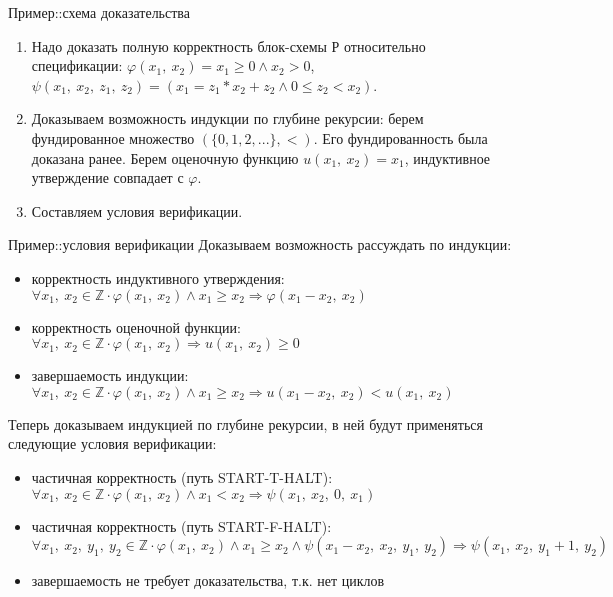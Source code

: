 \documentclass[hyperref={unicode=true}]{beamer}
\begin{document}
    \begin{frame}{Пример::схема доказательства}
    \begin{enumerate}
    \item
    Надо доказать полную корректность блок-схемы Р относительно
    спецификации: $\varphi(x_1,~x_2) = x_1 \geq 0 \land x_2 > 0$,
    $\psi(x_1,~x_2,~z_1,~z_2) = (x_1 = z_1 * x_2 + z_2 \land 0 \leq z_2 < x_2)$.

    \item
    Доказываем возможность индукции по глубине рекурсии:
    берем фундированное множество $(\{0, 1, 2, ...\}, <)$. Его фундированность
    была доказана ранее. Берем оценочную функцию $u(x_1,~x_2) = x_1$,
    индуктивное утверждение совпадает с $\varphi$.

    \item
    Составляем условия верификации.
    \end{enumerate}
    \end{frame}

    \begin{frame}{Пример::условия верификации}
    Доказываем возможность рассуждать по индукции:
    \begin{itemize}
    \item корректность индуктивного утверждения:
            $\forall x_1,~x_2 \in \mathbb{Z} \cdot
            \varphi(x_1,~x_2) \land x_1 \geq x_2
            \Rightarrow
            \varphi(x_1 - x_2,~x_2)$
    \item корректность оценочной функции:
            $\forall x_1,~x_2 \in \mathbb{Z} \cdot
            \varphi(x_1,~x_2)
            \Rightarrow
            u(x_1,~x_2) \geq 0$
    \item завершаемость индукции:
            $\forall x_1,~x_2 \in \mathbb{Z} \cdot
            \varphi(x_1,~x_2) \land x_1 \geq x_2
            \Rightarrow
            u(x_1 - x_2,~x_2) < u(x_1,~x_2)$
    \end{itemize}
    
    Теперь доказываем индукцией по глубине рекурсии,
    в ней будут применяться следующие условия верификации:
    \begin{itemize}
    \item частичная корректность (путь START-T-HALT):
            $\forall x_1,~x_2 \in \mathbb{Z} \cdot
            \varphi(x_1,~x_2) \land x_1 < x_2
            \Rightarrow
            \psi(x_1,~x_2,~0,~x_1)$
    \item частичная корректность (путь START-F-HALT):
            $\forall x_1,~x_2,~y_1,~y_2 \in \mathbb{Z} \cdot
            \varphi(x_1,~x_2) \land x_1 \geq x_2 \land
            \psi(x_1 - x_2,~x_2,~y_1,~y_2)
            \Rightarrow
            \psi(x_1,~x_2,~y_1 + 1,~y_2)$
    \item завершаемость не требует доказательства, т.к. нет циклов 
    \end{itemize}
    \end{frame}
\end{document}
